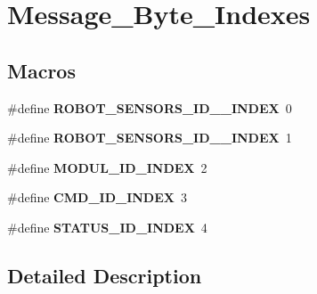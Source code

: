 \hypertarget{group___message___byte___indexes}{\section{Message\-\_\-\-Byte\-\_\-\-Indexes}
\label{group___message___byte___indexes}
}
\subsection*{Macros}
\begin{DoxyCompactItemize}
\item 
\hypertarget{group___message___byte___indexes_gafa3088942b0cf6f4880504e088b417ae}{\#define {\bfseries R\-O\-B\-O\-T\-\_\-\-S\-E\-N\-S\-O\-R\-S\-\_\-\-I\-D\-\_\-\_\-\-I\-N\-D\-E\-X}~0}\label{group___message___byte___indexes_gafa3088942b0cf6f4880504e088b417ae}

\item 
\hypertarget{group___message___byte___indexes_ga17fd8700973bd0d46e8043b641a4e7a2}{\#define {\bfseries R\-O\-B\-O\-T\-\_\-\-S\-E\-N\-S\-O\-R\-S\-\_\-\-I\-D\-\_\-\_\-\-I\-N\-D\-E\-X}~1}\label{group___message___byte___indexes_ga17fd8700973bd0d46e8043b641a4e7a2}

\item 
\hypertarget{group___message___byte___indexes_ga32beb89fcc6b2fd3a39eb9d99bf19724}{\#define {\bfseries M\-O\-D\-U\-L\-\_\-\-I\-D\-\_\-\-I\-N\-D\-E\-X}~2}\label{group___message___byte___indexes_ga32beb89fcc6b2fd3a39eb9d99bf19724}

\item 
\hypertarget{group___message___byte___indexes_ga862c2dee23981e7f38ed9a089581c6c8}{\#define {\bfseries C\-M\-D\-\_\-\-I\-D\-\_\-\-I\-N\-D\-E\-X}~3}\label{group___message___byte___indexes_ga862c2dee23981e7f38ed9a089581c6c8}

\item 
\hypertarget{group___message___byte___indexes_ga1bca295d7afdee8a1e79d64ee28a1203}{\#define {\bfseries S\-T\-A\-T\-U\-S\-\_\-\-I\-D\-\_\-\-I\-N\-D\-E\-X}~4}\label{group___message___byte___indexes_ga1bca295d7afdee8a1e79d64ee28a1203}

\end{DoxyCompactItemize}


\subsection{Detailed Description}
